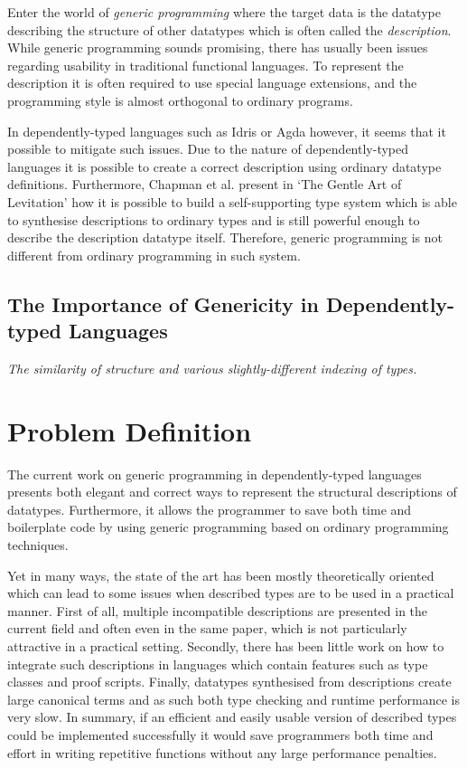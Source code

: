 \documentclass{ituthesis}
\begin{document}
Enter the world of \textit{generic programming} where the target data is the datatype describing the structure of other datatypes which is often called the \textit{description}.
While generic programming sounds promising, there has usually been issues regarding usability in traditional functional languages. To represent the description it is often required to use special language extensions, and the programming style is almost
orthogonal to ordinary programs.

In dependently-typed languages such as Idris or Agda however, it seems that it possible to mitigate such issues.
Due to the nature of dependently-typed languages it is possible to create a correct description using ordinary datatype definitions.
Furthermore, Chapman et al. present in `The Gentle Art of Levitation' how it is possible to build a self-supporting type system which is able to synthesise descriptions to ordinary types and is still powerful enough to describe the description datatype itself.
Therefore, generic programming is not different from ordinary programming in such system.

\subsection{The Importance of Genericity in Dependently-typed Languages}
\label{sub:TheImportanceofGenericityinDependently-typedLanguages}
\textit{The similarity of structure and various slightly-different indexing of types.}


\section{Problem Definition}
\label{sec:ProblemDefinition}
The current work on generic programming in dependently-typed languages presents both elegant and correct ways to represent the structural descriptions of datatypes. Furthermore, it allows the programmer to save both time and boilerplate code by using generic programming based on ordinary programming techniques.

Yet in many ways, the state of the art has been mostly theoretically oriented which can lead to some issues when described types are to be used in a practical manner.
First of all, multiple incompatible descriptions are presented in the current field and often even in the same paper, which is not particularly attractive in a practical setting.
Secondly, there has been little work on how to integrate such descriptions in languages which contain features such as type classes and proof scripts.
Finally, datatypes synthesised from descriptions create large canonical terms and as such both type checking and runtime performance is very slow.
In summary, if an efficient and easily usable version of described types could be implemented successfully it would save programmers both time and effort in writing repetitive functions without any large performance penalties.
\end{document}
